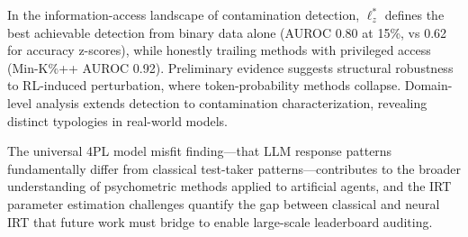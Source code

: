 \documentclass[11pt,a4paper]{article}
\begin{document}
In the information-access landscape of contamination detection, $\ell_z^*$ defines the best achievable detection from binary data alone (AUROC 0.80 at 15\%, vs 0.62 for accuracy z-scores), while honestly trailing methods with privileged access (Min-K\%++ AUROC 0.92).
Preliminary evidence suggests structural robustness to RL-induced perturbation, where token-probability methods collapse.
Domain-level analysis extends detection to contamination characterization, revealing distinct typologies in real-world models.

The universal 4PL model misfit finding---that LLM response patterns fundamentally differ from classical test-taker patterns---contributes to the broader understanding of psychometric methods applied to artificial agents, and the IRT parameter estimation challenges quantify the gap between classical and neural IRT that future work must bridge to enable large-scale leaderboard auditing.



\end{document}
